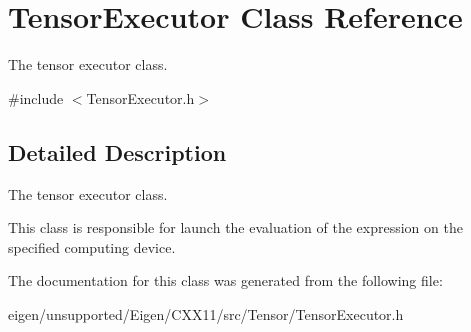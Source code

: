 \hypertarget{class_tensor_executor}{}\section{Tensor\+Executor Class Reference}
\label{class_tensor_executor}


The tensor executor class.  




{\ttfamily \#include $<$Tensor\+Executor.\+h$>$}



\subsection{Detailed Description}
The tensor executor class. 

This class is responsible for launch the evaluation of the expression on the specified computing device. 

The documentation for this class was generated from the following file\+:\begin{DoxyCompactItemize}
\item 
eigen/unsupported/\+Eigen/\+C\+X\+X11/src/\+Tensor/\+Tensor\+Executor.\+h\end{DoxyCompactItemize}
